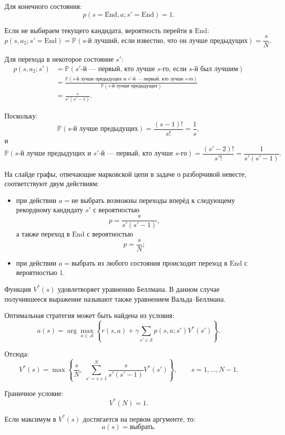 \documentclass[12pt,a4paper]{article}
\begin{document}
Для конечного состояния:
\[
p(s=\mathrm{End},a;s'=\mathrm{End})=1.
\]

Если не выбираем текущего кандидата, вероятность перейти в $\mathrm{End}$:
\[
p(s,a_2;s'=\mathrm{End})
=
\mathbb P
\left(
\text{$s$-й лучший, если известно, что он лучше предыдущих}
\right)
=
\frac{s}{N}.
\]

Для перехода в некоторое состояние $s'$:
\[
\begin{aligned}
p(s,a_2;s')
&=
\mathbb P
\left(
\text{$s'$-й --- первый, кто лучше $s$-го, если $s$-й был лучшим}
\right)
\\
&=
\frac{
\mathbb P
\left(
\text{$s$-й лучше предыдущих и $s'$-й --- первый, кто лучше $s$-го}
\right)
}{
\mathbb P
\left(
\text{$s$-й лучше предыдущих}
\right)
}
\\
&=
\frac{s}{s'(s'-1)}.
\end{aligned}
\]

Поскольку:
\[
\mathbb P
\left(
\text{$s$-й лучше предыдущих}
\right)
=
\frac{(s-1)!}{s!}
=
\frac{1}{s},
\]
и
\[
\mathbb P
\left(
\text{$s$-й лучше предыдущих и $s'$-й --- первый, кто лучше $s$-го}
\right)
=
\frac{(s'-2)!}{s'!}
=
\frac{1}{s'(s'-1)}.
\]

На слайде графы, отвечающие марковской цепи в задаче о разборчивой невесте, соответствуют двум действиям:
\begin{itemize}
    \item при действии $a=\text{не выбрать}$ возможны переходы вперёд к следующему рекордному кандидату $s'$ с вероятностью
    \[
    p=\frac{s}{s'(s'-1)},
    \]
    а также переход в $\mathrm{End}$ с вероятностью
    \[
    p=\frac{s}{N};
    \]
    \item при действии $a=\text{выбрать}$ из любого состояния происходит переход в $\mathrm{End}$ с вероятностью $1$.
\end{itemize}

Функция $V^\ast(s)$ удовлетворяет уравнению Беллмана. В данном случае получившееся выражение называют также уравнением Вальда--Беллмана.

Оптимальная стратегия может быть найдена из условия:
\[
a(s)
=
\arg\max_{a \in \mathcal A}
\left\{
r(s,a)
+
\gamma
\sum_{s' \in \mathcal S}
p(s,a;s')V^\ast(s')
\right\}.
\]

Отсюда:
\[
V^\ast(s)
=
\max
\left\{
\frac{s}{N},
\;
\sum_{s'=s+1}^{N}
\frac{s}{s'(s'-1)}
V^\ast(s')
\right\},
\qquad
s=1,\ldots,N-1.
\]

Граничное условие:
\[
V^\ast(N)=1.
\]

Если максимум в $V^\ast(s)$ достигается на первом аргументе, то:
\[
a(s)=\text{выбрать}.
\]
\end{document}
